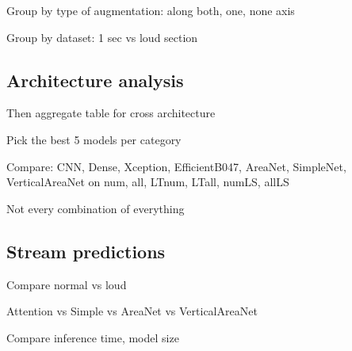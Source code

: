 Group by type of augmentation: along both, one, none axis

Group by dataset: 1 sec vs loud section

\subsection{Architecture analysis}

Then aggregate table for cross architecture

Pick the best 5 models per category

Compare: CNN, Dense, Xception, EfficientB047, AreaNet, SimpleNet, VerticalAreaNet
on num, all, LTnum, LTall, numLS, allLS

Not every combination of everything

\subsection{Stream predictions}

Compare normal vs loud

Attention vs Simple vs AreaNet vs VerticalAreaNet

Compare inference time, model size
